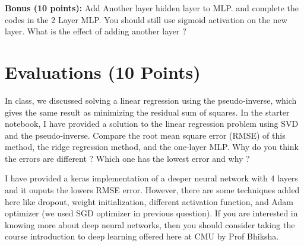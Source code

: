 \documentclass{article}
\begin{document}
\textbf{Bonus (10 points):} Add Another layer hidden layer to MLP. and complete the codes in the 2 Layer MLP.
You should still use sigmoid activation on the new layer. What is the effect of adding another layer ?

\section{Evaluations (10 Points)}
In class, we discussed solving a linear regression using the pseudo-inverse, which gives the same result as minimizing the residual sum of squares. In the starter notebook, I have provided a solution to the linear regression problem using SVD and the pseudo-inverse. Compare the root mean square error (RMSE) of this method, the ridge regression method, and the one-layer MLP. Why do you think the errors are different ?
Which one has the lowest error and why ?

I have provided a keras implementation of a deeper neural network with 4 layers and it ouputs the lowers
RMSE error. However, there are some techniques added here like dropout, weight initialization, different
activation function, and Adam optimizer (we used SGD optimizer in previous question). If you are interested
in knowing more about deep neural networks, then you should consider taking the course introduction to
deep learning offered here at CMU by Prof Bhiksha.
\end{document}
